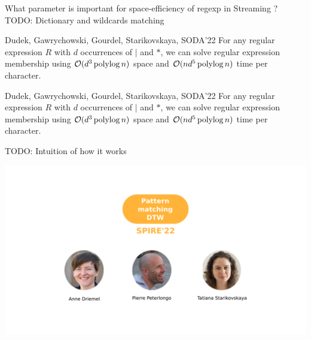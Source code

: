 \begin{frame}{What parameter is important for space-efficiency of regexp in Streaming ?}
    TODO: Dictionary and wildcards matching 

    \begin{myalertblock}{Dudek, Gawrychowski, Gourdel, Starikovskaya, SODA'22}
        For any regular expression $R$ with $d$ occurrences of $|$ and $\ast$, we can solve regular expression membership using $\mathcal{O}(d^{3}\operatorname{polylog} n)$ space and $\mathcal{O}(nd^{5}\operatorname{polylog} n)$ time per character.
    \end{myalertblock}
\end{frame}

\begin{frame}{}

    \begin{myalertblock}{Dudek, Gawrychowski, Gourdel, Starikovskaya, SODA'22}
        For any regular expression $R$ with $d$ occurrences of $|$ and $\ast$, we can solve regular expression membership using $\mathcal{O}(d^{3}\operatorname{polylog} n)$ space and $\mathcal{O}(nd^{5}\operatorname{polylog} n)$ time per character.
    \end{myalertblock}
    TODO: Intuition of how it works  
\end{frame}

\begin{frame}
    \includegraphics[width=\textwidth]{pictures/mindmap/dtw.png}
\end{frame}


\newcommand{\dtw}{\mathrm{DTW}}
\newcommand{\RLE}{\mathrm{RLE}}

